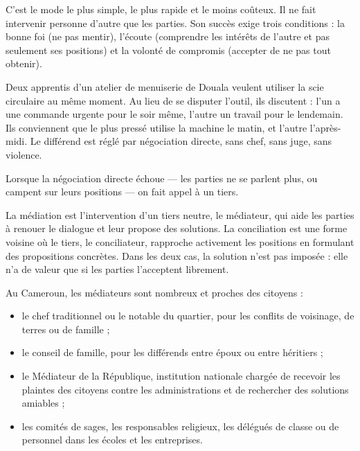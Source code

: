 \documentclass[11pt]{article}
\newcommand{\cle}[1]{{\popxbold\color{popdark}#1}}
\newcounter{popsec}
\newcounter{popsub}
\newcommand{\courssub}[1]{%
  \stepcounter{popsub}%
  \par\vspace{9pt}\noindent{\popxbold\fontsize{11.5}{13}\selectfont\color{popink}{\color{poporange}\thepopsec.\thepopsub}\hspace{6pt}#1}\par\nopagebreak\vspace{4pt}
}
\begin{document}
C'est le mode le plus simple, le plus rapide et le moins coûteux. Il ne fait intervenir personne d'autre que les parties. Son succès exige trois conditions : la \cle{bonne foi} (ne pas mentir), l'\cle{écoute} (comprendre les intérêts de l'autre et pas seulement ses positions) et la volonté de \cle{compromis} (accepter de ne pas tout obtenir).

\begin{exemplebox}
Deux apprentis d'un atelier de menuiserie de Douala veulent utiliser la scie circulaire au même moment. Au lieu de se disputer l'outil, ils discutent : l'un a une commande urgente pour le soir même, l'autre un travail pour le lendemain. Ils conviennent que le plus pressé utilise la machine le matin, et l'autre l'après-midi. Le différend est réglé par négociation directe, sans chef, sans juge, sans violence.
\end{exemplebox}

\courssub{La médiation et la conciliation}

Lorsque la négociation directe échoue — les parties ne se parlent plus, ou campent sur leurs positions — on fait appel à un \cle{tiers}.

\begin{definition}
La \cle{médiation} est l'intervention d'un tiers neutre, le \cle{médiateur}, qui aide les parties à renouer le dialogue et leur propose des solutions. La \cle{conciliation} est une forme voisine où le tiers, le conciliateur, rapproche activement les positions en formulant des propositions concrètes. Dans les deux cas, la solution n'est pas imposée : elle n'a de valeur que si les parties l'acceptent librement.
\end{definition}

Au Cameroun, les médiateurs sont nombreux et proches des citoyens :
\begin{itemize}
\item le \cle{chef traditionnel} ou le notable du quartier, pour les conflits de voisinage, de terres ou de famille ;
\item le \cle{conseil de famille}, pour les différends entre époux ou entre héritiers ;
\item le \cle{Médiateur de la République}, institution nationale chargée de recevoir les plaintes des citoyens contre les administrations et de rechercher des solutions amiables ;
\item les comités de sages, les responsables religieux, les délégués de classe ou de personnel dans les écoles et les entreprises.
\end{itemize}
\end{document}
